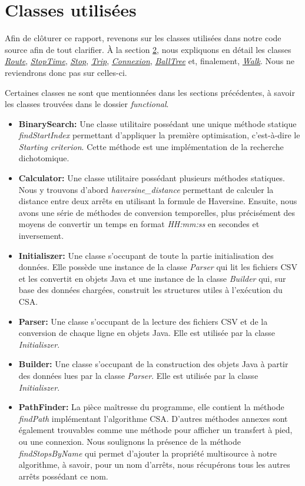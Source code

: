 \documentclass[12pt]{article}
\begin{document}
\section{Classes utilisées}
Afin de clôturer ce rapport, revenons sur les classes utilisées dans notre code source afin de tout clarifier. À la section \hyperref[sec:init]{2}, nous expliquons
en détail les classes \hyperref[sec:route]{\emph{Route}}, \hyperref[sec:stoptime]{\emph{StopTime}}, \hyperref[sec:stop]{\emph{Stop}}, \hyperref[sec:trip]{\emph{Trip}},
\hyperref[sec:connexion]{\emph{Connexion}}, \hyperref[sec:balltree]{\emph{BallTree}} et, finalement, \hyperref[sec:walk]{\emph{Walk}}. Nous ne reviendrons donc pas sur
celles-ci.

Certaines classes ne sont que mentionnées dans les sections précédentes, à savoir les classes trouvées dans le dossier \emph{functional}.
\begin{itemize}
  \item \textbf{BinarySearch: } Une classe utilitaire possédant une unique méthode statique \emph{findStartIndex} permettant d'appliquer la première optimisation, c'est-à-dire
                                le \emph{Starting criterion}. Cette méthode est une implémentation de la recherche dichotomique.
  \item \textbf{Calculator: }   Une classe utilitaire possédant plusieurs méthodes statiques. Nous y trouvons d'abord \emph{haversine\_distance} permettant de calculer la distance entre deux arrêts
                                en utilisant la formule de Haversine. Ensuite, nous avons une série de méthodes de conversion temporelles, plus précisément des moyens de convertir un temps
                                en format \emph{HH:mm:ss} en secondes et inversement.
  \item \textbf{Initialiszer: } Une classe s'occupant de toute la partie initialisation des données. Elle possède une instance de la classe \emph{Parser} qui lit les fichiers CSV et les convertit
                                en objets Java et une instance de la classe \emph{Builder} qui, sur base des données chargées, construit les structures utiles à l'exécution du CSA.
  \item \textbf{Parser: }       Une classe s'occupant de la lecture des fichiers CSV et de la conversion de chaque ligne en objets Java. Elle est utilisée par la classe \emph{Initialiszer}.
  \item \textbf{Builder: }      Une classe s'occupant de la construction des objets Java à partir des données lues par la classe \emph{Parser}. Elle est utilisée par la classe \emph{Initialiszer}.
  \item \textbf{PathFinder: }   La pièce maîtresse du programme, elle contient la méthode \emph{findPath} implémentant l'algorithme CSA. D'autres méthodes annexes sont également trouvables comme
                                une méthode pour afficher un transfert à pied, ou une connexion. Nous soulignons la présence de la méthode \emph{findStopsByName} qui permet d'ajouter
                                la propriété multisource à notre algorithme, à savoir, pour un nom d'arrêts, nous récupérons tous les autres arrêts possédant ce nom.
\end{itemize} 
\end{document}
